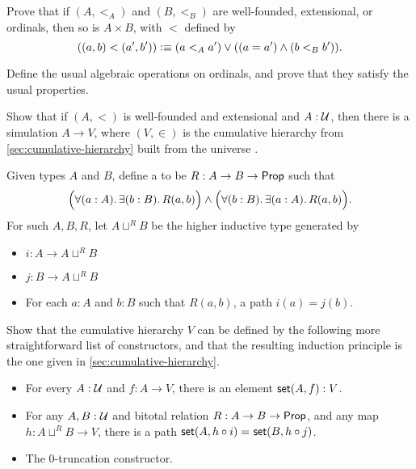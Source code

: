 \begin{ex}
  Prove that if $(A,<_A)$ and $(B,<_B)$ are well-founded, extensional, or ordinals, then so is $A\times B$, with $<$ defined by
  \[ ((a,b) <(a',b')) \vcentcolon\equiv (a<_A a') \vee ((a=a') \wedge (b<_B b')). \]
\end{ex}

\begin{ex}
  Define the usual algebraic operations on ordinals, and prove that they satisfy the usual properties.
\end{ex}

\begin{ex}
  Show that if $(A,<)$ is well-founded and extensional and $A:\mathcal{U}$, then there is a simulation $A\to V$, where $(V,\in)$ is the cumulative hierarchy from \autoref{sec:cumulative-hierarchy} built from the universe \UU.
\end{ex}

\begin{ex}\label{ex:cumhierhit}
  Given types $A$ and $B$, define a  to be $R:A\to B\to \mathsf{Prop}$ such that
  \[ \Big(\fall{a:A}\exis{b:B} R(a,b) \Big) \land \Big(\fall{b:B}\exis{a:A} R(a,b) \Big). \]
  For such $A,B,R$, let $A\sqcup^R B$ be the higher inductive type generated by
  \begin{itemize}
  \item $i:A\to A\sqcup^R B$
  \item $j:B\to A\sqcup^R B$
  \item For each $a:A$ and $b:B$ such that $R(a,b)$, a path $i(a)=j(b)$.
  \end{itemize}
  Show that the cumulative hierarchy $V$ can be defined by the following more straightforward list of constructors, and that the resulting induction principle is the one given in \autoref{sec:cumulative-hierarchy}.
  \begin{itemize}
  \item For every $A : \mathcal{U}$ and $f : A \to V$, there is an element $\mathsf{set}(A, f) : V$.
  \item For any $A,B:\mathcal{U}$ and bitotal relation $R:A\to B\to \mathsf{Prop}$, and any map $h:A\sqcup^R B \to V$, there is a path $\mathsf{set}(A,h\circ i) =_{} \mathsf{set}(B,h\circ j)$.
  \item The 0-truncation constructor.
  \end{itemize}
\end{ex}

